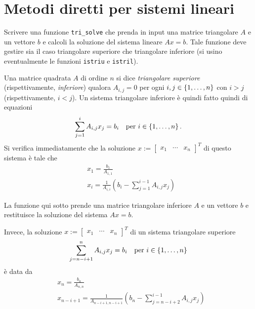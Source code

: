 
\section{Metodi diretti per sistemi lineari}

\begin{esercizio}
Scrivere una funzione \lstinline£tri_solve£ che prenda in input una matrice triangolare \(A\) e un vettore \(b\) e calcoli la soluzione del sistema lineare \(Ax = b\). Tale funzione deve gestire sia il caso triangolare superiore che triangolare inferiore (si usino eventualmente le funzioni \lstinline£istriu£ e \lstinline£istril£).
\end{esercizio}

Una matrice quadrata \(A\) di ordine \(n\) si dice {\em triangolare superiore} (rispettivamente, {\em inferiore}) qualora \(A_{i, j} = 0\) per ogni \(i, j \in \left\{1, \dots{}, n\right\}\) con \(i > j\) (rispettivamente, \(i < j\)). Un sistema triangolare inferiore è quindi fatto quindi di equazioni
\[\sum_{j = 1}^i A_{i, j} x_j = b_i \quad\text{per } i \in \left\{1, \dots{}, n\right\} .\]
Si verifica immediatamente che la soluzione \(x := \begin{bmatrix} x_1 & \cdots{} & x_n \end{bmatrix}^T\) di questo sistema è tale che
\begin{align*}
& x_1 = \frac{b_1}{A_{1,1}} \\
& x_i = \frac{1}{A_{i, i}} \left(b_i -\sum_{j = 1}^{i-1} A_{i, j} x_j\right)
\end{align*}

La funzione qui sotto prende una matrice triangolare inferiore \(A\) e un vettore \(b\) e restituisce la soluzione del sistema \(Ax = b\).



Invece, la soluzione \(x := \begin{bmatrix} x_1 & \cdots{} & x_n \end{bmatrix}^T\) di un sistema triangolare superiore
\[\sum_{j = n-i+1}^{n} A_{i, j} x_j = b_i \quad\text{per } i \in \left\{1, \dots{}, n\right\}\]
è data da
\begin{align*}
& x_n = \frac{b_n}{A_{n,n}} \\
& x_{n-i+1} = \frac{1}{A_{n-i+1, n-i+1}} \left(b_n -\sum_{j = n-i+2}^{i-1} A_{i, j} x_j\right)
\end{align*}

